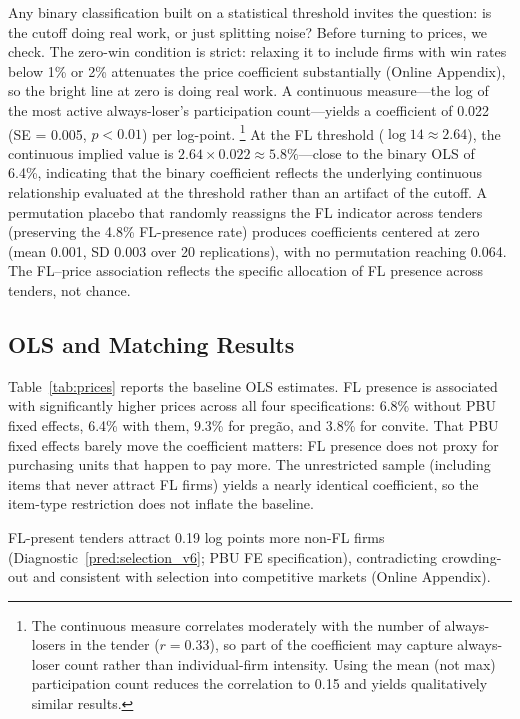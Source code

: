 Any binary classification built on a statistical threshold invites
the question: is the cutoff doing real work, or just splitting noise?
Before turning to prices, we check. The zero-win condition is strict: relaxing it to include
firms with win rates below 1\% or 2\% attenuates the price coefficient
substantially (Online Appendix), so the bright line at zero is
doing real work. A continuous measure---the log of the most active
always-loser's participation count---yields a coefficient of 0.022
(SE = 0.005, $p < 0.01$) per log-point.%
\footnote{The continuous measure correlates moderately with the number
of always-losers in the tender ($r = 0.33$), so part of the
coefficient may capture always-loser count rather than individual-firm
intensity. Using the mean (not max) participation count reduces the
correlation to 0.15 and yields qualitatively similar results.}
At the FL threshold ($\log 14 \approx 2.64$), the continuous implied value
is $2.64 \times 0.022 \approx 5.8\%$---close to the binary OLS of
6.4\%, indicating that the binary coefficient reflects the underlying
continuous relationship evaluated at the threshold rather than an
artifact of the cutoff. A permutation placebo that randomly reassigns
the FL indicator across tenders (preserving the 4.8\% FL-presence rate)
produces coefficients centered at zero (mean 0.001, SD 0.003 over 20
replications), with no permutation reaching 0.064. The FL--price
association reflects the specific allocation of FL presence across
tenders, not chance.


\subsection{OLS and Matching Results}
\label{sec:results_ols}

Table~\ref{tab:prices} reports the baseline OLS estimates. FL
presence is associated with significantly higher prices across all
four specifications: 6.8\% without PBU fixed effects, 6.4\% with
them, 9.3\% for preg\~ao, and 3.8\% for convite. That PBU fixed
effects barely move the coefficient matters: FL presence does not
proxy for purchasing units that happen to pay more. The unrestricted sample (including items that never
attract FL firms) yields a nearly identical coefficient, so the
item-type restriction does not inflate the baseline.



FL-present tenders attract 0.19 log points more non-FL firms
(Diagnostic~\ref{pred:selection_v6}; PBU FE specification),
contradicting crowding-out and consistent with selection into
competitive markets
(Online Appendix).

